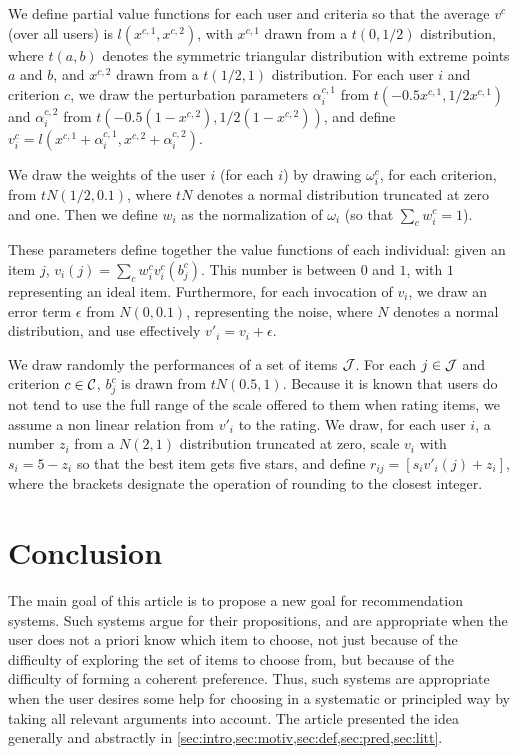 \documentclass[version=3.21, pagesize, twoside=off, bibliography=totoc, DIV=calc, fontsize=12pt, a4paper, french, english]{scrartcl}
\begin{document}
We define partial value functions for each user and criteria so that the average $v^c$ (over all users) is $l(x^{c, 1}, x^{c, 2})$, with $x^{c, 1}$ drawn from a $t(0, 1/2)$ distribution, where $t(a, b)$ denotes the symmetric triangular distribution with extreme points $a$ and $b$, and $x^{c, 2}$ drawn from a $t(1/2, 1)$ distribution.
For each user $i$ and criterion $c$, we draw the perturbation parameters $\alpha^{c, 1}_i$ from $t(-0.5 x^{c, 1}, 1/2 x^{c, 1})$ and $\alpha^{c, 2}_i$ from $t(-0.5 (1-x^{c, 2}), 1/2 (1-x^{c, 2}))$, and define $v^c_i = l(x^{c, 1}+\alpha^{c, 1}_i, x^{c, 2} + \alpha^{c, 2}_i)$.

We draw the weights of the user $i$ (for each $i$) by drawing $\omega^c_i$, for each criterion, from $tN(1/2, 0.1)$, where $tN$ denotes a normal distribution truncated at zero and one. Then we define $w_i$ as the normalization of $\omega_i$ (so that $\sum_c w_i^c = 1$).

These parameters define together the value functions of each individual: given an item $j$, $v_i(j) = \sum_c w^c_i v_i^c(b^c_j)$. This number is between $0$ and $1$, with $1$ representing an ideal item. Furthermore, for each invocation of $v_i$, we draw an error term $\epsilon$ from $N(0, 0.1)$, representing the noise, where $N$ denotes a normal distribution, and use effectively $v'_i = v_i + \epsilon$.

We draw randomly the performances of a set of items $\mathcal{J}$. For each $j \in \mathcal{J}$ and criterion $c \in \mathcal{C}$, $b_j^c$ is drawn from $tN(0.5, 1)$. Because it is known that users do not tend to use the full range of the scale offered to them when rating items, we assume a non linear relation from $v'_i$ to the rating. We draw, for each user $i$, a number $z_i$ from a $N(2, 1)$ distribution truncated at zero, scale $v_i$ with $s_i = 5 - z_i$ so that the best item gets five stars, and define $r_{ij} = [s_i v'_i(j) + z_i]$, where the brackets designate the operation of rounding to the closest integer. 

\section{Conclusion}
The main goal of this article is to propose a new goal for recommendation systems. Such systems argue for their propositions, and are appropriate when the user does not a priori know which item to choose, not just because of the difficulty of exploring the set of items to choose from, but because of the difficulty of forming a coherent preference. Thus, such systems are appropriate when the user desires some help for choosing in a systematic or principled way by taking all relevant arguments into account.
The article presented the idea generally and abstractly in \cref{sec:intro,sec:motiv,sec:def,sec:pred,sec:litt}. 
\end{document}
